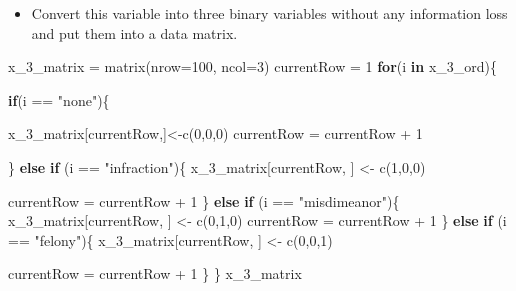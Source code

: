 \documentclass[
]{article}
\newenvironment{Shaded}{\begin{snugshade}}{\end{snugshade}}
\newcommand{\AttributeTok}[1]{\textcolor[rgb]{0.77,0.63,0.00}{#1}}
\newcommand{\ControlFlowTok}[1]{\textcolor[rgb]{0.13,0.29,0.53}{\textbf{#1}}}
\newcommand{\DecValTok}[1]{\textcolor[rgb]{0.00,0.00,0.81}{#1}}
\newcommand{\FunctionTok}[1]{\textcolor[rgb]{0.00,0.00,0.00}{#1}}
\newcommand{\NormalTok}[1]{#1}
\newcommand{\OtherTok}[1]{\textcolor[rgb]{0.56,0.35,0.01}{#1}}
\newcommand{\SpecialCharTok}[1]{\textcolor[rgb]{0.00,0.00,0.00}{#1}}
\newcommand{\StringTok}[1]{\textcolor[rgb]{0.31,0.60,0.02}{#1}}
\providecommand{\tightlist}{%
  \setlength{\itemsep}{0pt}\setlength{\parskip}{0pt}}
\begin{document}
\begin{itemize}
\tightlist
\item
  Convert this variable into three binary variables without any
  information loss and put them into a data matrix.
\end{itemize}

\begin{Shaded}
\begin{Highlighting}[]
\NormalTok{x\_3\_matrix }\OtherTok{=} \FunctionTok{matrix}\NormalTok{(}\AttributeTok{nrow=}\DecValTok{100}\NormalTok{, }\AttributeTok{ncol=}\DecValTok{3}\NormalTok{)}
\NormalTok{currentRow }\OtherTok{=} \DecValTok{1}
\ControlFlowTok{for}\NormalTok{(i }\ControlFlowTok{in}\NormalTok{ x\_3\_ord)\{}
  
  \ControlFlowTok{if}\NormalTok{(i }\SpecialCharTok{==} \StringTok{"none"}\NormalTok{)\{}
    
\NormalTok{    x\_3\_matrix[currentRow,]}\OtherTok{\textless{}{-}}\FunctionTok{c}\NormalTok{(}\DecValTok{0}\NormalTok{,}\DecValTok{0}\NormalTok{,}\DecValTok{0}\NormalTok{)}
\NormalTok{    currentRow }\OtherTok{=}\NormalTok{ currentRow }\SpecialCharTok{+} \DecValTok{1}
    
\NormalTok{  \} }\ControlFlowTok{else} \ControlFlowTok{if}\NormalTok{ (i }\SpecialCharTok{==} \StringTok{"infraction"}\NormalTok{)\{}
\NormalTok{    x\_3\_matrix[currentRow, ] }\OtherTok{\textless{}{-}}  \FunctionTok{c}\NormalTok{(}\DecValTok{1}\NormalTok{,}\DecValTok{0}\NormalTok{,}\DecValTok{0}\NormalTok{)}
    
\NormalTok{    currentRow }\OtherTok{=}\NormalTok{ currentRow }\SpecialCharTok{+} \DecValTok{1}
\NormalTok{  \} }\ControlFlowTok{else} \ControlFlowTok{if}\NormalTok{ (i }\SpecialCharTok{==} \StringTok{"misdimeanor"}\NormalTok{)\{}
\NormalTok{    x\_3\_matrix[currentRow, ] }\OtherTok{\textless{}{-}}  \FunctionTok{c}\NormalTok{(}\DecValTok{0}\NormalTok{,}\DecValTok{1}\NormalTok{,}\DecValTok{0}\NormalTok{)}
\NormalTok{    currentRow }\OtherTok{=}\NormalTok{ currentRow }\SpecialCharTok{+} \DecValTok{1}
\NormalTok{  \} }\ControlFlowTok{else} \ControlFlowTok{if}\NormalTok{ (i }\SpecialCharTok{==} \StringTok{"felony"}\NormalTok{)\{}
\NormalTok{    x\_3\_matrix[currentRow, ] }\OtherTok{\textless{}{-}}  \FunctionTok{c}\NormalTok{(}\DecValTok{0}\NormalTok{,}\DecValTok{0}\NormalTok{,}\DecValTok{1}\NormalTok{)}
    
\NormalTok{    currentRow }\OtherTok{=}\NormalTok{ currentRow }\SpecialCharTok{+} \DecValTok{1}
\NormalTok{  \}}
\NormalTok{\}}
\NormalTok{x\_3\_matrix}
\end{Highlighting}
\end{Shaded}
\end{document}
